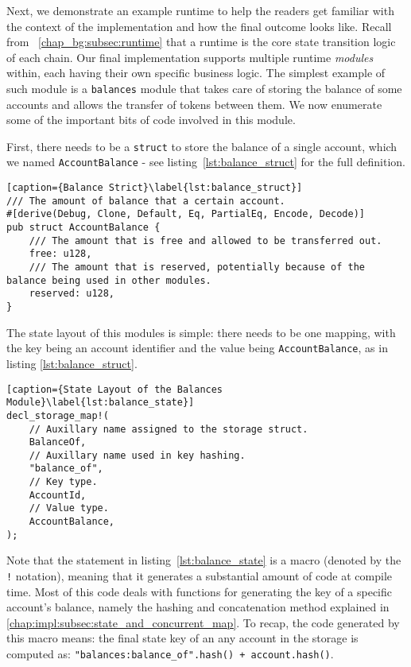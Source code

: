 Next, we demonstrate an example runtime to help the readers get familiar with the context of the implementation and how the final outcome looks like. Recall from ~\ref{chap_bg:subsec:runtime} that a runtime is the core state transition logic of each chain. Our final implementation supports
multiple runtime \textit{modules} within, each having their own specific business
logic. The simplest example of such module is a \texttt{balances} module that takes care of storing
the balance of some accounts and allows the transfer of tokens between them. We now enumerate some
of the important bits of code involved in this module.

First, there needs to be a \texttt{struct} to store the balance of a single account, which we named
\texttt{AccountBalance} - see listing~\ref{lst:balance_struct} for the full definition.

\begin{lstlisting}[caption={Balance Strict}\label{lst:balance_struct}]
/// The amount of balance that a certain account.
#[derive(Debug, Clone, Default, Eq, PartialEq, Encode, Decode)]
pub struct AccountBalance {
	/// The amount that is free and allowed to be transferred out.
	free: u128,
	/// The amount that is reserved, potentially because of the balance being used in other modules.
	reserved: u128,
}
\end{lstlisting}

The state layout of this modules is simple: there needs to be one mapping, with the key being an
account identifier and the value being \texttt{AccountBalance}, as in listing
\ref{lst:balance_struct}.

\begin{lstlisting}[caption={State Layout of the Balances Module}\label{lst:balance_state}]
decl_storage_map!(
	// Auxillary name assigned to the storage struct.
	BalanceOf,
	// Auxillary name used in key hashing.
	"balance_of",
	// Key type.
	AccountId,
	// Value type.
	AccountBalance,
);
\end{lstlisting}

Note that the statement in listing~\ref{lst:balance_state} is a macro (denoted by the \texttt{!} notation), meaning that it
generates a substantial amount of code at compile time. Most of this code deals with functions for
generating the key of a specific account's balance, namely the hashing and concatenation method
explained in \ref{chap:impl:subsec:state_and_concurrent_map}. To recap, the code generated by this
macro means: the final state key of an any account in the storage is computed as:
\texttt{"balances:balance\_of".hash() + account.hash()}.

